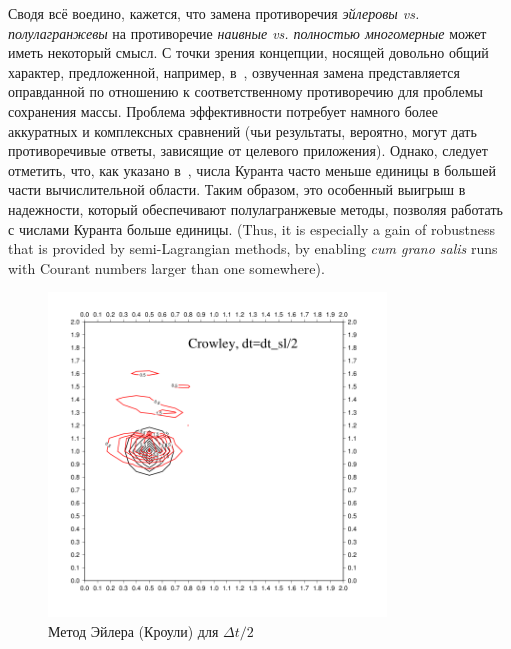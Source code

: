 Сводя всё воедино, кажется, что замена противоречия \textit{эйлеровы vs. полулагранжевы} на противоречие \textit{наивные vs. полностью многомерные} может иметь некоторый смысл. С точки зрения концепции, носящей довольно общий характер, предложенной, например, в~\cite{A43}, озвученная замена представляется оправданной по отношению к соответственному противоречию для проблемы сохранения массы. Проблема эффективности потребует намного более аккуратных и комплексных сравнений (чьи результаты, вероятно, могут дать противоречивые ответы, зависящие от целевого приложения). Однако, следует отметить, что, как указано в~\cite{A26}, числа Куранта часто меньше единицы в большей части вычислительной области. Таким образом, это особенный выигрыш в надежности, который обеспечивают полулагранжевые методы, позволяя работать с числами Куранта больше единицы. (Thus, it is especially a gain of robustness that is provided by semi-Lagrangian methods, by enabling \textit{cum grano salis} runs with Courant numbers larger than one somewhere).
%
\begin{figure}[ht] 
	\centering
	\includegraphics[width=0.8\textwidth,height=0.8\textwidth]{images/6_9}
	\caption{Метод Эйлера (Кроули) для $\Delta t/2$}
	\label{img:6_9}
\end{figure}
%
%
